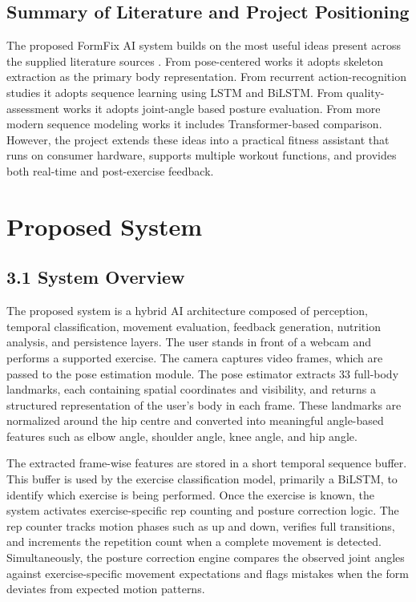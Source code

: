 \documentclass[12pt,a4paper]{report}
\begin{document}
\section{Summary of Literature and Project Positioning}
The proposed FormFix AI system builds on the most useful ideas present across the supplied literature sources \cite{ai_trainer_paper,yoga_arxiv,paper_1374,ijsret_1052,icacc2021_03031,visapp_2024_266}. From pose-centered works it adopts skeleton extraction as the primary body representation. From recurrent action-recognition studies it adopts sequence learning using LSTM and BiLSTM. From quality-assessment works it adopts joint-angle based posture evaluation. From more modern sequence modeling works it includes Transformer-based comparison. However, the project extends these ideas into a practical fitness assistant that runs on consumer hardware, supports multiple workout functions, and provides both real-time and post-exercise feedback.


\chapter{Proposed System}

\section{3.1 System Overview}
The proposed system is a hybrid AI architecture composed of perception, temporal classification, movement evaluation, feedback generation, nutrition analysis, and persistence layers. The user stands in front of a webcam and performs a supported exercise. The camera captures video frames, which are passed to the pose estimation module. The pose estimator extracts 33 full-body landmarks, each containing spatial coordinates and visibility, and returns a structured representation of the user’s body in each frame. These landmarks are normalized around the hip centre and converted into meaningful angle-based features such as elbow angle, shoulder angle, knee angle, and hip angle.

The extracted frame-wise features are stored in a short temporal sequence buffer. This buffer is used by the exercise classification model, primarily a BiLSTM, to identify which exercise is being performed. Once the exercise is known, the system activates exercise-specific rep counting and posture correction logic. The rep counter tracks motion phases such as up and down, verifies full transitions, and increments the repetition count when a complete movement is detected. Simultaneously, the posture correction engine compares the observed joint angles against exercise-specific movement expectations and flags mistakes when the form deviates from expected motion patterns.
\end{document}
